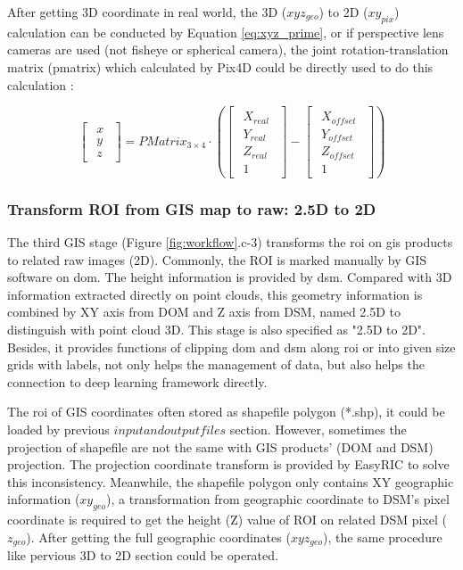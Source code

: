 \documentclass{configs/bmcart}
\begin{document}
After getting 3D coordinate in real world, the 3D ($xyz_{geo}$) to 2D ($xy_{pix}$) calculation can be conducted by Equation \ref{eq:xyz_prime}, or if perspective lens cameras are used (not fisheye or spherical camera), the joint rotation-translation matrix (pmatrix) which calculated by Pix4D could be directly used to do this calculation \cite{pix4d_support_what_2020}:

$$
\begin{bmatrix}\begin{matrix} x \\ y \\ z\end{matrix}\end{bmatrix}
= PMatrix_{3\times4} \cdot 
\left(\begin{bmatrix}\begin{matrix} 
  X_{real} \\ Y_{real} \\ Z_{real} \\ 1
\end{matrix}\end{bmatrix} 
- 
\begin{bmatrix}\begin{matrix} 
  X_{offset} \\ Y_{offset} \\ Z_{offset} \\ 1
\end{matrix}\end{bmatrix}
\right)
$$

\subsubsection*{Transform ROI from GIS map to raw: 2.5D to 2D}
The third GIS stage (Figure \ref{fig:workflow}.c-3) transforms the \acrfull*{roi} on \acrfull*{gis} products to related raw images (2D). Commonly, the ROI is marked manually by GIS software on \acrfull*{dom}. The height information is provided by \acrfull*{dsm}. Compared with 3D information extracted directly on point clouds, this geometry information is combined by XY axis from DOM and Z axis from DSM, named 2.5D to distinguish with point cloud 3D. This stage is also specified as "2.5D to 2D". Besides, it provides functions of clipping \acrshort*{dom} and \acrshort*{dsm} along \acrshort*{roi} or into given size grids with labels, not only helps the management of data, but also helps the connection to deep learning framework directly.

The \acrfull*{roi} of GIS coordinates often stored as shapefile polygon (*.shp), it could be loaded by previous $input and output files$ section. However, sometimes the projection of shapefile are not the same with GIS products' (DOM and DSM) projection. The projection coordinate transform is provided by EasyRIC to solve this inconsistency. Meanwhile, the shapefile polygon only contains XY geographic information ($xy_{geo}$), a transformation from geographic coordinate to DSM's pixel coordinate is required to get the height (Z) value of ROI on related DSM pixel ($z_{geo}$). After getting the full geographic coordinates ($xyz_{geo}$), the same procedure like pervious 3D to 2D section could be operated.
\end{document}
